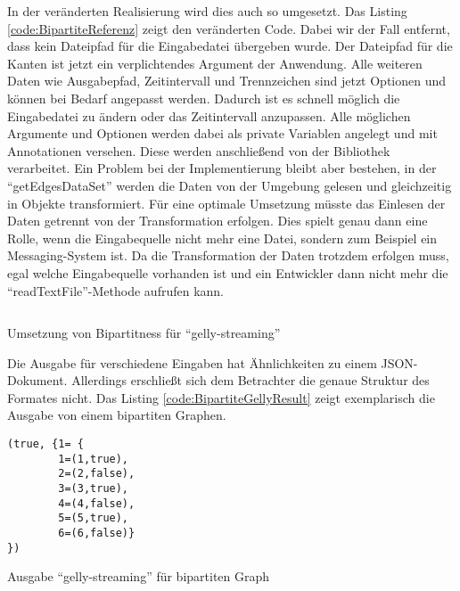In der veränderten Realisierung wird dies auch so umgesetzt. Das Listing \ref{code:BipartiteReferenz}
zeigt den veränderten Code. Dabei wir der Fall entfernt, dass kein Dateipfad
für die Eingabedatei übergeben wurde. Der Dateipfad für die Kanten ist jetzt ein
verplichtendes Argument der Anwendung. Alle weiteren Daten wie Ausgabepfad,
Zeitintervall und Trennzeichen sind jetzt Optionen und können bei Bedarf angepasst
werden. Dadurch ist es schnell möglich die Eingabedatei zu ändern oder das
Zeitintervall anzupassen. Alle möglichen Argumente und Optionen werden dabei als
private Variablen angelegt und mit Annotationen versehen. Diese werden anschließend
von der Bibliothek verarbeitet.  Ein Problem bei der Implementierung bleibt aber
bestehen, in der \enquote{getEdgesDataSet} werden die Daten von der Umgebung
gelesen und gleichzeitig in Objekte transformiert. Für eine optimale Umsetzung
müsste das Einlesen der Daten getrennt von der Transformation erfolgen.
Dies spielt genau dann eine Rolle, wenn die Eingabequelle nicht mehr eine Datei,
sondern zum Beispiel ein Messaging-System ist. Da die Transformation der
Daten trotzdem erfolgen muss, egal welche Eingabequelle vorhanden ist und ein
Entwickler dann nicht mehr die \enquote{readTextFile}-Methode aufrufen kann.

\begin{listing}
\inputminted[breaklines=true]{java}{../material/code/GellyStreamingResult.java}
\caption{Umsetzung von Bipartitness für \enquote{gelly-streaming}}
\label{code:BipartiteReferenz}
\end{listing}

Die Ausgabe für verschiedene Eingaben hat Ähnlichkeiten zu einem
\gls{JSON}-Dokument. Allerdings erschließt sich dem Betrachter die genaue
Struktur des Formates nicht. Das Listing \ref{code:BipartiteGellyResult} zeigt
exemplarisch die Ausgabe von einem bipartiten Graphen.

\begin{listing}
\begin{verbatim}
(true, {1= {
        1=(1,true),
        2=(2,false),
        3=(3,true),
        4=(4,false),
        5=(5,true),
        6=(6,false)}
})
\end{verbatim}
\caption{Ausgabe \enquote{gelly-streaming} für bipartiten Graph}
\label{code:BipartiteGellyResult}
\end{listing}

